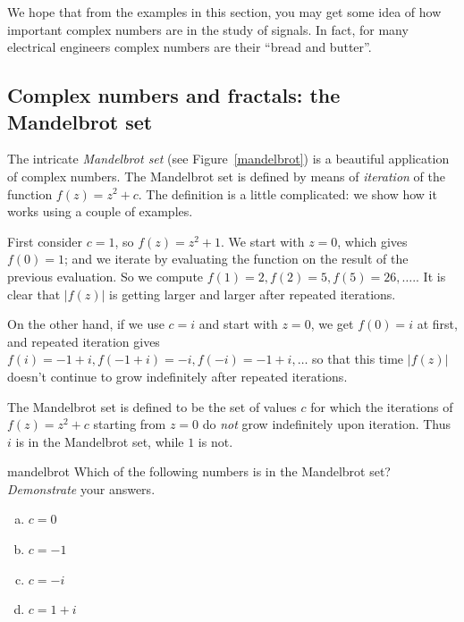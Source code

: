 We hope that from the examples in this section, you may get some idea of how important complex numbers are in the study of signals. In fact, for many electrical engineers complex numbers are their ``bread and butter''. 


\subsection{Complex numbers and fractals: the Mandelbrot set} \label{sec:mandelbrot}
The intricate \emph{Mandelbrot set} (see Figure~\ref{mandelbrot}) is a beautiful application of complex numbers.
The Mandelbrot set is defined by means of \emph{iteration} of the function $f(z) = z^2 + c$. The definition is a little complicated: we show how it works using a couple of examples.

First consider $c=1$, so $f(z) = z^2 + 1$. We start with $z=0$, which gives $f(0) = 1$; and we iterate by evaluating the function on the result of the previous evaluation. So we compute $f(1) = 2, f(2) = 5, f(5) = 26, \ldots.$. It is clear that $|f(z)|$ is getting larger and larger after repeated iterations. 

On the other hand, if we use $c=i$ and start with $z=0$, we get $f(0) = i$ at first, and repeated iteration gives $f(i) = -1+i, f(-1+i) =- i, f(-i) = -1 + i, \ldots$ so that this time $|f(z)|$ doesn't continue to grow indefinitely after repeated iterations. 

The Mandelbrot set is defined to be the set of values $c$ for which the iterations of $f(z) = z^2 + c$ starting from $z=0$ do \emph{not} grow indefinitely upon iteration. Thus $i$ is in the Mandelbrot set, while $1$ is not. 

\begin{exercise}{mandelbrot}
Which of the following numbers is in the Mandelbrot set? \emph{Demonstrate} your answers.
\begin{multicols}{2}
\begin{enumerate}[(a)]
\item
$c = 0$
\item
$c = -1$
\item
$c = -i$
\item
$c = 1+i$
\end{enumerate}
\end{multicols}
\end{exercise}

